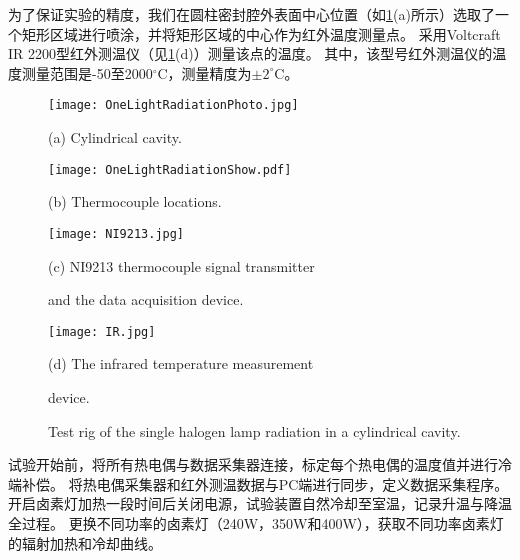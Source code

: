 为了保证实验的精度，我们在圆柱密封腔外表面中心位置（如\ref{Fig:OneLightRadiation}(a)所示）选取了一个矩形区域进行喷涂，并将矩形区域的中心作为红外温度测量点。
采用Voltcraft IR 2200型红外测温仪（见\ref{Fig:OneLightRadiation}(d)）测量该点的温度。
其中，该型号红外测温仪的温度测量范围是-50至2000$^{\circ}$C，测量精度为$\pm2^{\circ}$C。

\begin{figure}
  \begin{minipage}[t]{0.5\linewidth} %
  \nonumber
    \centering
    \texttt{[image: OneLightRadiationPhoto.jpg]}
    \centerline{(a) Cylindrical cavity.}
    \label{Fig:OneLightRadiationShow}
  \end{minipage}%
  \begin{minipage}[t]{0.5\linewidth}
    \centering
    \texttt{[image: OneLightRadiationShow.pdf]}
    \centerline{(b) Thermocouple locations.}
    \label{Fig:OneLightRadiationPhoto}
  \end{minipage}

  \begin{minipage}[t]{0.5\linewidth} %
  \nonumber
    \centering
    \texttt{[image: NI9213.jpg]}
    \centerline{(c) NI9213 thermocouple signal transmitter }
    \centerline{and the data acquisition device. }
    \label{Fig:NI9213}
  \end{minipage}%
  \begin{minipage}[t]{0.5\linewidth}
    \centering
    \texttt{[image: IR.jpg]}
    \centerline{(d) The infrared temperature measurement }
    \centerline{device.}
    \label{Fig:IR}
  \end{minipage}


  \caption{Test rig of the single halogen lamp radiation in a cylindrical cavity.}
  \label{Fig:OneLightRadiation}
\end{figure}

试验开始前，将所有热电偶与数据采集器连接，标定每个热电偶的温度值并进行冷端补偿。
将热电偶采集器和红外测温数据与PC端进行同步，定义数据采集程序。
开启卤素灯加热一段时间后关闭电源，试验装置自然冷却至室温，记录升温与降温全过程。
更换不同功率的卤素灯（240W，350W和400W），获取不同功率卤素灯的辐射加热和冷却曲线。

